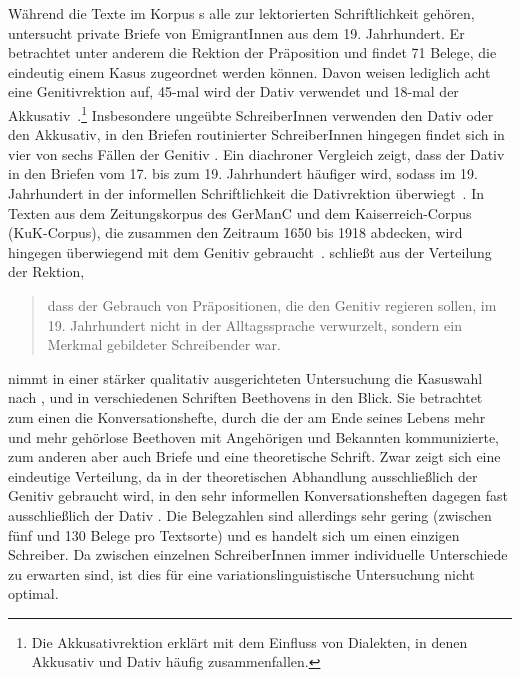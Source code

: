 Während die Texte im Korpus \citeauthor{DiMeola2000}s alle zur lektorierten Schriftlichkeit gehören, untersucht \citet[]{Elspa2005} private Briefe von EmigrantInnen aus dem 19. Jahrhundert. 
Er betrachtet unter anderem die Rektion der Präposition \wegen{} und findet 71 Belege, die eindeutig einem Kasus zugeordnet werden k{\"o}nnen. 
Davon weisen lediglich acht eine Genitivrektion auf, 45-mal wird der Dativ verwendet und 18-mal der Akkusativ~\citep[s.][321]{Elspa2005}.\footnote{Die Akkusativrektion erklärt \citet[]{Elspa2005} mit dem Einfluss von Dialekten, in denen Akkusativ und Dativ häufig zusammenfallen.}
Insbesondere unge{\"u}bte SchreiberInnen verwenden den Dativ oder den Akkusativ, in den Briefen routinierter SchreiberInnen hingegen findet sich in vier von sechs Fällen der Genitiv \citep[s.][321--323]{Elspa2005}. 
Ein diachroner Vergleich zeigt, dass der Dativ in den Briefen vom 17. bis zum 19. Jahrhundert h{\"a}ufiger wird, sodass im 19. Jahrhundert in der informellen Schriftlichkeit die Dativrektion {\"u}berwiegt~\citep[s.][411]{Elspa.2015}. 
In Texten aus dem Zeitungskorpus des GerManC und dem Kaiserreich-Corpus (KuK-Corpus), die zusammen den Zeitraum 1650 bis 1918 abdecken, wird \wegen{} hingegen {\"u}berwiegend mit dem Genitiv gebraucht~\citep[s.][410]{Elspa.2015}. 
\citeauthor{Elspa2005} schlie{\ss}t aus der Verteilung der Rektion, \begin{quote}dass der Gebrauch von Pr{\"a}positionen, die den Genitiv regieren sollen, im 19. Jahrhundert nicht in der Alltagssprache verwurzelt, sondern ein Merkmal gebildeter Schreibender war.~\citep[321]{Elspa2005}\end{quote}
\citet[]{Sato.2015} nimmt in einer stärker qualitativ ausgerichteten Untersuchung die Kasuswahl nach \wegen{}, \waehrend{} und  in verschiedenen Schriften Beethovens in den Blick.  Sie betrachtet zum einen die Konversationshefte, durch die der am Ende seines Lebens mehr und mehr gehörlose Beethoven mit Angehörigen und Bekannten kommunizierte, zum anderen aber auch Briefe und eine theoretische Schrift. 
Zwar zeigt sich eine eindeutige Verteilung, da in der theoretischen Abhandlung ausschließlich der Genitiv gebraucht wird, in den sehr informellen Konversationsheften dagegen fast ausschließlich der Dativ \citep[s.][27]{Sato.2015}. 
Die Belegzahlen sind allerdings sehr gering (zwischen fünf und 130 Belege pro Textsorte) und es handelt sich um einen einzigen Schreiber. 
Da zwischen einzelnen SchreiberInnen immer individuelle Unterschiede zu erwarten sind, ist dies für eine variationslinguistische Untersuchung nicht optimal. 
